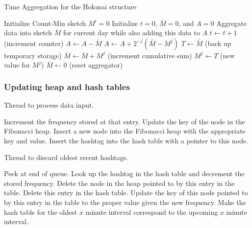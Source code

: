 \documentclass[a4paper,12pt]{article}
\begin{document}
\begin{algorithm}
\caption{Time Aggregation for the Hokusai structure}\label{alg1}
\begin{algorithmic}[1]
	\State Initialize Count-Min sketch $M^i = 0$
\EndFor
\State Initialize $t = 0$, $\bar{M} = 0$, and $A = 0$
	\State Aggregate data into sketch $\bar{M}$ for current day while also adding this data to $A$
	\State $t \leftarrow t + 1$ (increment counter)
	\State $A \leftarrow A - \bar{M}$
		\State $A \leftarrow A + 2^{-j}(\bar{M} - M^j)$
		\State $T \leftarrow \bar{M}$ (back up temporary storage)
		\State $\bar{M} \leftarrow \bar{M} + M^j$ (increment cumulative sum)
		\State $M^j \leftarrow T$ (new value for $M^j$)
	\EndFor
	\State $\bar{M} \leftarrow 0$ (reset aggregator)
\EndWhile
\end{algorithmic}
\end{algorithm}

\subsubsection{Updating heap and hash tables}

\begin{algorithm}
\caption{Thread to process data input.}
\begin{algorithmic}[1]
		\State Increment the frequency stored at that entry.
		\State Update the key of the node in the Fibonacci heap.
	\Else
		\State Insert a new node into the Fibonacci heap with the appropriate key and value. 
		\State Insert the hashtag into the hash table with a pointer to this node.
 	\EndIf
\EndWhile
\end{algorithmic}
\end{algorithm}


\begin{algorithm}
\caption{Thread to discard oldest recent hashtags.}
\begin{algorithmic}[1]
\Loop
		\State Peek at end of queue.
			\State Look up the hashtag in the hash table and decrement the stored frequency.
				\State Delete the node in the heap pointed to by this entry in the table.
				\State Delete this entry in the hash table.
			\Else	
				\State Update the key of this node pointed to by this entry in the table to the proper value given the new frequency.
			\EndIf
		\EndIf
	\EndIf
\EndLoop
\State Make the hash table for the oldest $x$ minute interval correspond to the upcoming $x$ minute interval.

\end{algorithmic}
\end{algorithm}
\end{document}
